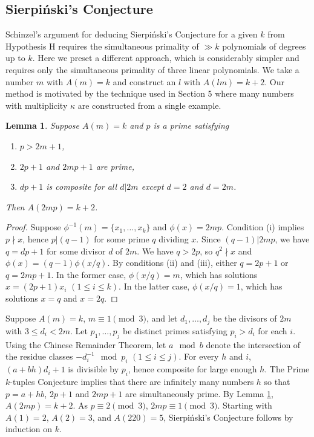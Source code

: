 \documentclass[11pt]{amsart}
\theoremstyle{remark}
\theoremstyle{plain}
\newtheorem{lem}{Lemma}[section]
\numberwithin{equation}{section}
\renewcommand{\(}{\left(}
\renewcommand{\)}{\right)}
\renewcommand{\le}{\leqslant}
\begin{document}
\subsection{Sierpi\'nski's Conjecture}

Schinzel's argument for deducing Sierpi\'nski's Conjecture for a given $k$ from
Hypothesis H requires the simultaneous primality of $\gg k$ polynomials
of degrees up to $k$.  Here we preset a different approach, which is
considerably simpler and requires only the simultaneous primality
of three linear polynomials.
We take a number $m$ with $A(m)=k$ and
construct an $l$ with $A(lm)=k+2$.  Our method is motivated
by the technique used in Section 5 where many numbers with multiplicity
$\kappa$ are constructed from a single example.

\begin{lem} \label{k to k+2} Suppose $A(m)=k$ and $p$ is a prime
satisfying
\begin{enumerate}
\item[(i)] $p > 2m+1$,
\item[(ii)] $2p+1$ and $2mp+1$ are prime,
\item[(iii)] $dp+1$ is composite for all $d|2m$ except
$d=2$ and $d=2m$.
\end{enumerate}
Then $A(2mp) = k+2$.
\end{lem}

\begin{proof}  Suppose $\phi^{-1}(m) = \{x_1, \ldots, x_k\}$ and
$\phi(x)=2mp$.  Condition (i) implies $p\nmid x$, hence $p|(q-1)$ for some
prime $q$ dividing $x$.  Since $(q-1)|2mp$, we have $q=dp+1$ for some divisor
$d$ of $2m$.  We have $q>2p$, so $q^2 \nmid x$ and $\phi(x)=
(q-1)\phi(x/q)$.
By conditions (ii) and (iii), either $q=2p+1$ or $q=2mp+1$.
In the former case, $\phi(x/q)=m$, which has solutions $x=(2p+1)x_i$
$(1 \le i \le k)$.  In the latter case, $\phi(x/q)=1$, which has solutions
$x=q$ and $x=2q$.
 \end{proof}

Suppose $A(m)=k$, $m\equiv 1\pmod{3}$,
 and let $d_1, \ldots, d_j$ be the divisors of $2m$
with $3\le d_i<2m$.
Let $p_1, \ldots, p_j$ be distinct primes satisfying $p_i>d_i$ for each $i$.
Using the Chinese Remainder Theorem, let $a \mod b$ denote the
intersection of the residue classes $-d_i^{-1} \mod p_i$ $(1\le i\le j)$.
For every $h$ and $i$, $(a+bh)d_i+1$ is divisible by $p_i$,
hence composite for large enough $h$.
The Prime $k$-tuples
Conjecture implies that there are infinitely many numbers $h$ so that
$p=a+hb$, $2p+1$ and $2mp+1$ are simultaneously prime.
By Lemma \ref{k to k+2}, $A(2mp)=k+2$.
As $p\equiv 2\pmod{3}$, $2mp \equiv 1\pmod{3}$.
Starting with $A(1)=2$, $A(2)=3$, and $A(220)=5$,
Sierpi\'nski's Conjecture follows by induction on $k$.
\end{document}
